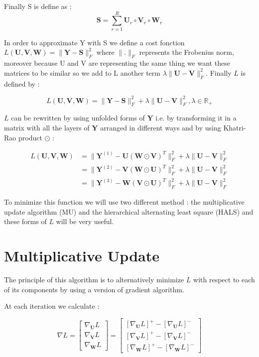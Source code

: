 \documentclass{article}
\begin{document}
Finally S is define as : 
\[
    \mathbf{S} = \sum_{r = 1}^R \mathbf{U}_r \circ \mathbf{V}_r \circ \mathbf{W}_r
\]

In order to approximate Y with S we define a cost fonction $L(\mathbf{U}, \mathbf{V}, \mathbf{W})=\|\mathbf{Y}-\mathbf{S}\|_{F}^2$ where $\|.\|_F$ represents the Frobenius norm,
moreover because U and V are representing the same thing we want these matrices to be similar so we add to L another term $\lambda\|\mathbf{U}-\mathbf{V}\|_{F}^2$.
 Finally $L$ is defined by :

\[
    L(\mathbf{U}, \mathbf{V}, \mathbf{W})=\|\mathbf{Y}-\mathbf{S}\|_{F}^2 +\lambda \|\mathbf{U}-\mathbf{V}\|_{F}^2, \lambda \in \mathbb{R}_+
\]

$L$ can be rewritten by using unfolded forms of $\mathbf{Y}$ i.e. by transforming it in a matrix with all the layers of $\mathbf{Y}$
arranged in different ways and by using Khatri-Rao product $\odot$ :

\begin{align*}
L(\mathbf{U}, \mathbf{V}, \mathbf{W}) &= \|\mathbf{Y}^{(1)}-\mathbf{U}(\mathbf{W}\odot \mathbf{V})^{T}\|_{F}^2 +\lambda \|\mathbf{U}-\mathbf{V}\|_{F}^2 \\
                &= \|\mathbf{Y}^{(2)}-\mathbf{V}(\mathbf{W}\odot \mathbf{U})^{T}\|_{F}^2 +\lambda \|\mathbf{U}-\mathbf{V}\|_{F}^2\\
                &= \|\mathbf{Y}^{(3)}-\mathbf{W}(\mathbf{V}\odot \mathbf{U})^{T}\|_{F}^2 +\lambda \|\mathbf{U}-\mathbf{V}\|_{F}^2
\end{align*}

To minimize this function we will use two
different method : the multiplicative update algorithm (MU) and the hierarchical alternating least square (HALS) and these forms of
$L$ will be very useful.

\section{Multiplicative Update}
The principle of this algorithm is to alternatively minimize $L$ with respect to each of its components by
using a version of gradient algorithm.

At each iteration we calculate :

\[\nabla L = \begin{bmatrix}
                \nabla_{\mathbf{U}} L\\
                \nabla_{\mathbf{V}} L \\
                \nabla_{\mathbf{W}} L 
            \end{bmatrix} = \begin{bmatrix}
                                [\nabla_{\mathbf{U}} L]^{+}-[\nabla_{\mathbf{U}} L]^{-}\\
                                [\nabla_{\mathbf{V}} L]^{+}-[\nabla_{\mathbf{V}} L]^{-} \\
                                [\nabla_{\mathbf{W}} L]^{+}-[\nabla_{\mathbf{W}} L]^{-} 
                            \end{bmatrix}
\]
\end{document}
